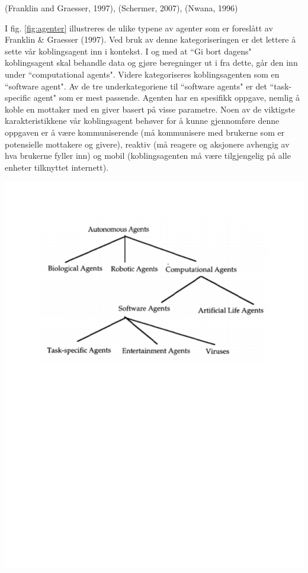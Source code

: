 (Franklin and Graesser, 1997), (Schermer, 2007), (Nwana, 1996)

I fig. \ref{fig:agenter} illustreres de ulike typene av agenter som er foreslått av Franklin \& Graesser (1997). Ved bruk av denne kategoriseringen er det lettere å sette vår koblingsagent inn i kontekst. I og med at ``Gi bort dagens" koblingsagent skal behandle data og gjøre beregninger ut i fra dette, går den inn under ``computational agents". Videre kategoriseres koblingsagenten som en ``software agent". Av de tre underkategoriene til ``software agents" er det ``task-specific agent" som er mest passende. Agenten har en spesifikk oppgave, nemlig å koble en mottaker med en giver basert på visse parametre. Noen av de viktigste karakteristikkene vår koblingsagent behøver for å kunne gjennomføre denne oppgaven er å være kommuniserende (må kommunisere med brukerne som er potensielle mottakere og givere), reaktiv (må reagere og aksjonere avhengig av hva brukerne fyller inn) og mobil (koblingsagenten må være tilgjengelig på alle enheter tilknyttet internett).


\begin{center}
\includegraphics[clip=true, width=1 \textwidth,
trim=0cm 14cm 0cm 1.5cm]{agenter.pdf}
\label{fig:agenter}
\end{center}
